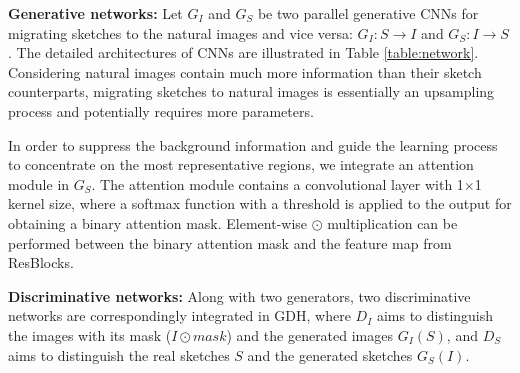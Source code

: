 \documentclass[runningheads]{llncs}
\begin{document}
\noindent\textbf{Generative networks:} Let $G_I$ and $G_S$ be two parallel generative CNNs for migrating sketches to the natural images and vice versa: $G_I : S \rightarrow I$ and $G_S : I \rightarrow S$. The detailed architectures of CNNs are illustrated in Table \ref{table:network}. Considering natural images contain much more information than their sketch counterparts, migrating sketches to natural images is essentially an upsampling process and potentially requires more parameters. 

In order to suppress the background information and guide the learning process to concentrate on the most representative regions, we integrate an attention module \cite{song2017deep,abs-1711-09347} in $G_S$. The attention module contains a convolutional layer with 1$\times$1 kernel size, where a softmax function with a threshold is applied to the output for obtaining a binary attention mask. Element-wise $\odot$ multiplication can be performed between the binary attention mask and the feature map from ResBlocks.

 
\noindent\textbf{Discriminative networks:} Along with two generators, two discriminative networks are correspondingly integrated in GDH, where $D_I$ aims to distinguish the images with its mask ($I \odot mask$) and the generated images $G_I\left(S\right)$, and $D_S$ aims to distinguish the real sketches $S$ and the generated sketches $G_S\left(I\right)$. 
\end{document}
